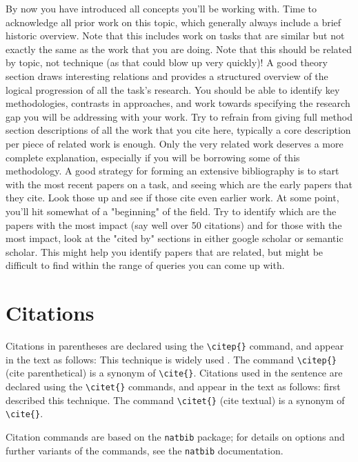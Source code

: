 By now you have introduced all concepts you'll be working with. Time to acknowledge all prior work on this topic, which generally always include a brief historic overview. Note that this includes work on tasks that are similar but not exactly the same as the work that you are doing. Note that this should be related by topic, not technique (as that could blow up very quickly)! A good theory section draws interesting relations and provides a structured overview of the logical progression of all the task's research. You should be able to identify key methodologies, contrasts in approaches, and work towards specifying the research gap you will be addressing with your work. Try to refrain from giving full method section descriptions of all the work that you cite here, typically a core description per piece of related work is enough. Only the very related work deserves a more complete explanation, especially if you will be borrowing some of this methodology. A good strategy for forming an extensive bibliography is to start with the most recent papers on a task, and seeing which are the early papers that they cite. Look those up and see if those cite even earlier work. At some point, you'll hit somewhat of a "beginning" of the field. Try to identify which are the papers with the most impact (say well over 50 citations) and for those with the most impact, look at the "cited by" sections in either google scholar or semantic scholar. This might help you identify papers that are related, but might be difficult to find within the range of queries you can come up with.

\section{Citations} \label{sec:citations}

Citations in parentheses are declared using the \verb|\citep{}| command, and appear in the text as follows: This technique is widely used \citep{woods1970}. The command \verb|\citep{}| (cite parenthetical) is a synonym of \verb|\cite{}|. Citations used in the sentence are declared using the \verb|\citet{}| commands, and appear in the text as follows: \citet{woods1970} first described this technique. The command \verb|\citet{}| (cite textual) is a synonym of \verb|\cite{}|.

Citation commands are based on the \verb|natbib| package; for details on options and further variants of the commands, see the \verb|natbib| documentation.
